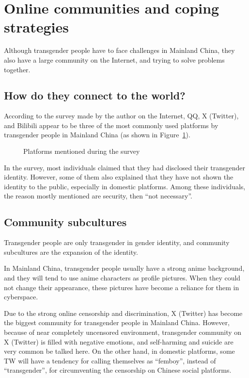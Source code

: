 \documentclass{article}
\begin{document}
	\section{Online communities and coping strategies}
	Although transgender people have to face challenges in Mainland China, they also have a large community on the Internet, and trying to solve problems together.

		\subsection{How do they connect to the world?}
		According to the survey made by the author on the Internet, QQ, X (Twitter), and Bilibili appear to be three of the most commonly used platforms by transgender people in Mainland China (as shown in Figure~\ref{dis:mentions}). 

		\begin{figure}[htbp]
			\centering
			\begin{tikzpicture}
				
			\end{tikzpicture}
			\caption{Platforms mentioned during the survey}\label{dis:mentions}
		\end{figure}

		In the survey, most individuals claimed that they had disclosed their transgender identity. However, some of them also explained that they have not shown the identity to the public, especially in domestic platforms. Among these individuals, the reason mostly mentioned are security, then ``not necessary''.

		\subsection{Community subcultures}
		Transgender people are only transgender in gender identity,  and community subcultures are the expansion of the identity.

		In Mainland China, transgender people usually have a strong anime background, and they will tend to use anime characters as profile pictures. When they could not change their appearance, these pictures have become a reliance for them in cyberspace. 

		Due to the strong online censorship and discrimination, X (Twitter) has become the biggest community for transgender people in Mainland China. However, because of near completely uncensored environment, transgender community on X (Twitter) is filled with negative emotions, and self-harming and suicide are very common be talked here. On the other hand, in domestic platforms, some TW will have a tendency for calling themselves as ``femboy'', instead of ``transgender'', for circumventing the censorship on Chinese social platforms.
\end{document}
